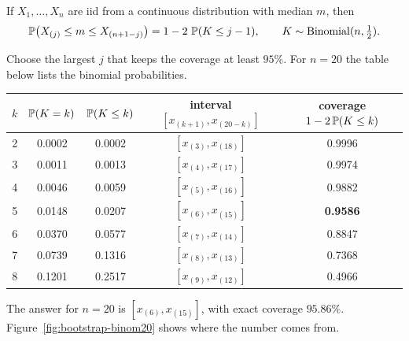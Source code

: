 \begin{theorem}
If $X_1,\dots,X_n$ are iid from a continuous distribution with median $m$, then
\[
  \P\!\left( X_{(j)} \le m \le X_{(n+1-j)} \right) = 1 - 2\,\P(K \le j-1),
  \qquad K \sim \Bin(n, \tfrac12).
\]
\end{theorem}

Choose the largest $j$ that keeps the coverage at least $95\%$. For $n=20$ the
table below lists the binomial probabilities.

\begin{center}
\small
\begin{tabular}{c c c c c}
\toprule
$k$ & $\P(K = k)$ & $\P(K \le k)$ & interval $[x_{(k+1)}, x_{(20-k)}]$ & coverage $1 - 2\P(K\le k)$\\
\midrule
2 & 0.0002 & 0.0002 & $[x_{(3)}, x_{(18)}]$ & 0.9996\\
3 & 0.0011 & 0.0013 & $[x_{(4)}, x_{(17)}]$ & 0.9974\\
4 & 0.0046 & 0.0059 & $[x_{(5)}, x_{(16)}]$ & 0.9882\\
5 & 0.0148 & 0.0207 & $[x_{(6)}, x_{(15)}]$ & \textbf{0.9586}\\
6 & 0.0370 & 0.0577 & $[x_{(7)}, x_{(14)}]$ & 0.8847\\
7 & 0.0739 & 0.1316 & $[x_{(8)}, x_{(13)}]$ & 0.7368\\
8 & 0.1201 & 0.2517 & $[x_{(9)}, x_{(12)}]$ & 0.4966\\
\bottomrule
\end{tabular}
\end{center}

The answer for $n=20$ is $[x_{(6)}, x_{(15)}]$, with exact coverage $95.86\%$.
Figure~\ref{fig:bootstrap-binom20} shows where the number comes from.

